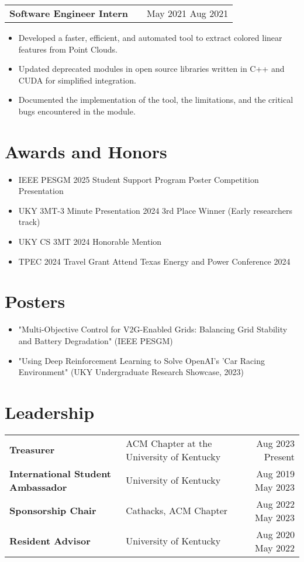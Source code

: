 \documentclass[a4paper,12pt]{article}
\makeatletter
\newenvironment{joblong}[2]
    {
    \begin{tabularx}{\linewidth}{@{}l X r@{}}
    \textbf{#1} & \hfill &  #2 \\[3.75pt]
    \end{tabularx}
    \begin{minipage}[t]{\linewidth}
    \begin{itemize}[nosep,after=\strut, leftmargin=1em, itemsep=3pt,label=--]
    }
    {
    \end{itemize}
    \end{minipage}    
    }
\makeatother
\begin{document}
\begin{joblong}{Software Engineer Intern}{May 2021 Aug 2021} %
\item Developed a faster, efficient, and automated tool to extract colored linear features from Point Clouds. %
\item Updated deprecated modules in open source libraries written in C++ and CUDA for simplified integration. %
\item Documented the implementation of the tool, the limitations, and the critical bugs encountered in the module. %
\end{joblong}

\section{Awards and Honors}
\begin{itemize}[nosep,after=\strut, leftmargin=1em, itemsep=3pt,label=--]
\item IEEE PESGM 2025 Student Support Program Poster Competition Presentation %
\item UKY 3MT-3 Minute Presentation 2024 3rd Place Winner (Early researchers track) %
\item UKY CS 3MT 2024 Honorable Mention %
\item TPEC 2024 Travel Grant Attend Texas Energy and Power Conference 2024 %
\end{itemize}

\section{Posters}
\begin{itemize}[nosep,after=\strut, leftmargin=1em, itemsep=3pt,label=--]
\item "Multi-Objective Control for V2G-Enabled Grids: Balancing Grid Stability and Battery Degradation" (IEEE PESGM) %
\item "Using Deep Reinforcement Learning to Solve OpenAI's 'Car Racing Environment" (UKY Undergraduate Research Showcase, 2023) %
\end{itemize}

\section{Leadership}
\begin{tabularx}{\linewidth}{@{}l X r@{}}
\textbf{Treasurer} & ACM Chapter at the University of Kentucky & Aug 2023 Present \\ %
\textbf{International Student Ambassador} & University of Kentucky & Aug 2019 May 2023 \\ %
\textbf{Sponsorship Chair} & Cathacks, ACM Chapter & Aug 2022 May 2023 \\ %
\textbf{Resident Advisor} & University of Kentucky & Aug 2020 May 2022 \\ %
\end{tabularx}
\end{document}
